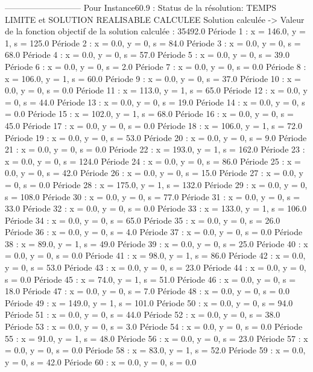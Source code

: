 ---------------------------
Pour Instance60.9  :
Status de la résolution: TEMPS LIMITE et SOLUTION REALISABLE CALCULEE
Solution calculée
-> Valeur de la fonction objectif de la solution calculée :  35492.0
Période 1 : x = 146.0, y = 1, s = 125.0
Période 2 : x = 0.0, y = 0, s = 84.0
Période 3 : x = 0.0, y = 0, s = 68.0
Période 4 : x = 0.0, y = 0, s = 57.0
Période 5 : x = 0.0, y = 0, s = 39.0
Période 6 : x = 0.0, y = 0, s = 2.0
Période 7 : x = 0.0, y = 0, s = 0.0
Période 8 : x = 106.0, y = 1, s = 60.0
Période 9 : x = 0.0, y = 0, s = 37.0
Période 10 : x = 0.0, y = 0, s = 0.0
Période 11 : x = 113.0, y = 1, s = 65.0
Période 12 : x = 0.0, y = 0, s = 44.0
Période 13 : x = 0.0, y = 0, s = 19.0
Période 14 : x = 0.0, y = 0, s = 0.0
Période 15 : x = 102.0, y = 1, s = 68.0
Période 16 : x = 0.0, y = 0, s = 45.0
Période 17 : x = 0.0, y = 0, s = 0.0
Période 18 : x = 106.0, y = 1, s = 72.0
Période 19 : x = 0.0, y = 0, s = 53.0
Période 20 : x = 0.0, y = 0, s = 9.0
Période 21 : x = 0.0, y = 0, s = 0.0
Période 22 : x = 193.0, y = 1, s = 162.0
Période 23 : x = 0.0, y = 0, s = 124.0
Période 24 : x = 0.0, y = 0, s = 86.0
Période 25 : x = 0.0, y = 0, s = 42.0
Période 26 : x = 0.0, y = 0, s = 15.0
Période 27 : x = 0.0, y = 0, s = 0.0
Période 28 : x = 175.0, y = 1, s = 132.0
Période 29 : x = 0.0, y = 0, s = 108.0
Période 30 : x = 0.0, y = 0, s = 77.0
Période 31 : x = 0.0, y = 0, s = 33.0
Période 32 : x = 0.0, y = 0, s = 0.0
Période 33 : x = 133.0, y = 1, s = 106.0
Période 34 : x = 0.0, y = 0, s = 65.0
Période 35 : x = 0.0, y = 0, s = 26.0
Période 36 : x = 0.0, y = 0, s = 4.0
Période 37 : x = 0.0, y = 0, s = 0.0
Période 38 : x = 89.0, y = 1, s = 49.0
Période 39 : x = 0.0, y = 0, s = 25.0
Période 40 : x = 0.0, y = 0, s = 0.0
Période 41 : x = 98.0, y = 1, s = 86.0
Période 42 : x = 0.0, y = 0, s = 53.0
Période 43 : x = 0.0, y = 0, s = 23.0
Période 44 : x = 0.0, y = 0, s = 0.0
Période 45 : x = 74.0, y = 1, s = 51.0
Période 46 : x = 0.0, y = 0, s = 18.0
Période 47 : x = 0.0, y = 0, s = 7.0
Période 48 : x = 0.0, y = 0, s = 0.0
Période 49 : x = 149.0, y = 1, s = 101.0
Période 50 : x = 0.0, y = 0, s = 94.0
Période 51 : x = 0.0, y = 0, s = 44.0
Période 52 : x = 0.0, y = 0, s = 38.0
Période 53 : x = 0.0, y = 0, s = 3.0
Période 54 : x = 0.0, y = 0, s = 0.0
Période 55 : x = 91.0, y = 1, s = 48.0
Période 56 : x = 0.0, y = 0, s = 23.0
Période 57 : x = 0.0, y = 0, s = 0.0
Période 58 : x = 83.0, y = 1, s = 52.0
Période 59 : x = 0.0, y = 0, s = 42.0
Période 60 : x = 0.0, y = 0, s = 0.0

